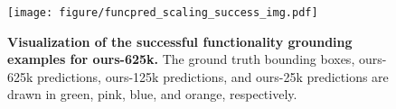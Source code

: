 \begin{figure}[th]
    \centering
    \texttt{[image: figure/funcpred\_scaling\_success\_img.pdf]}
    \caption{\textbf{Visualization of the successful functionality grounding examples for ours-625k.} The ground truth bounding boxes, ours-625k predictions, ours-125k predictions, and ours-25k predictions are drawn in \textcolor[rgb]{0, 0.6, 0.13}{green}, \textcolor[rgb]{1.0, 0.0, 1.0}{pink}, \textcolor[rgb]{0.0, 0.4, 0.8}{blue}, and \textcolor[rgb]{1.0, 0.65, 0.0}{orange}, respectively.}
    \label{fig:funcpred scaling success}
\end{figure}
